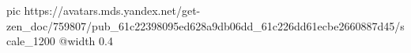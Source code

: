  
 
 
 
 

\ifcmt
  pic https://avatars.mds.yandex.net/get-zen_doc/759807/pub_61c22398095ed628a9db06dd_61c226dd61ecbe2660887d45/scale_1200
  @width 0.4
\fi

